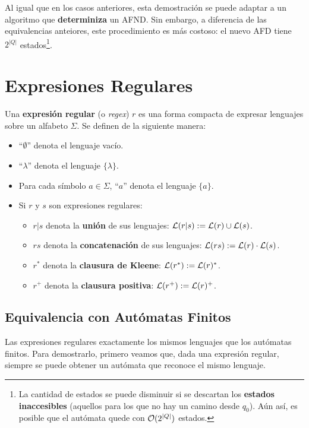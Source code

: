 Al igual que en los casos anteriores, esta demostración se puede adaptar a un algoritmo que \textbf{determiniza} un AFND. Sin embargo, a diferencia de las equivalencias anteiores, este procedimiento es más costoso: el nuevo AFD tiene $2^{|Q|}$ estados\footnote{La cantidad de estados se puede disminuir si se descartan los \textbf{estados inaccesibles} (aquellos para los que no hay un camino desde $q_0$). Aún así, es posible que el autómata quede con $\mathcal{O}(2^{|Q|})$ estados.}.

\section{Expresiones Regulares}

Una \textbf{expresión regular} (o \textit{regex}) $r$ es una forma compacta de expresar lenguajes sobre un alfabeto $\Sigma$. Se definen de la siguiente manera:
\begin{itemize}
    \item ``$\emptyset$'' denota el lenguaje vacío.
    \item ``$\lambda$'' denota el lenguaje $\{\lambda\}$.
    \item Para cada símbolo $a \in \Sigma$, ``$a$'' denota el lenguaje $\{a\}$.
    \item Si $r$ y $s$ son expresiones regulares:
    \begin{itemize}
        \item $r|s$ denota la \textbf{unión} de sus lenguajes: $\mathcal{L}(r|s) := \mathcal{L}(r) \cup \mathcal{L}(s)$.
        \item $rs$ denota la \textbf{concatenación} de sus lenguajes: $\mathcal{L}(rs) := \mathcal{L}(r) \cdot \mathcal{L}(s)$.
        \item $r^*$ denota la \textbf{clausura de Kleene}: $\mathcal{L}(r^*) := \mathcal{L}(r)^*$.
        \item $r^+$ denota la \textbf{clausura positiva}: $\mathcal{L}(r^+) := \mathcal{L}(r)^+$.
    \end{itemize}
\end{itemize}

\subsection{Equivalencia con Autómatas Finitos}

Las expresiones regulares exactamente los mismos lenguajes que los autómatas finitos. Para demostrarlo, primero veamos que, dada una expresión regular, siempre se puede obtener un autómata que reconoce el mismo lenguaje.


